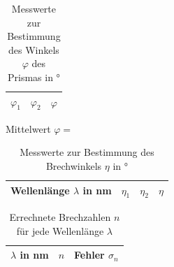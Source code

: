 \begin{table}[h!]
	\centering	
	\begin{tabular}{c|c|c}
		$\varphi_1$ & $\varphi_2$ & $\varphi$ \\
		\hline
		
	\end{tabular}
	\caption{Messwerte zur Bestimmung des Winkels $\varphi$ des Prismas in \si{\degree}}
	\label{tab:WinkelPhi}
\end{table}
Mittelwert $\varphi = $

\begin{table}[h!]
	\centering	
	\begin{tabular}{c|c|c|c}
		Wellenlänge $\lambda$ in \si{\nano\meter} & $\eta_1$ & $\eta_2$ & $\eta$ \\
		\hline
		
	\end{tabular}
	\caption{Messwerte zur Bestimmung des Brechwinkels $\eta$ in \si{\degree}}
	\label{tab:WinkelFarben}
\end{table}

\begin{table}[h!]
	\centering	
	\begin{tabular}{c|c|c}
		$\lambda$ in \si{\nano\meter} & $n$ & Fehler $\sigma_n$ \\
		\hline
		
	\end{tabular}
	\caption{Errechnete Brechzahlen $n$ für jede Wellenlänge $\lambda$}
	\label{tab:Brechzahl}
\end{table}


